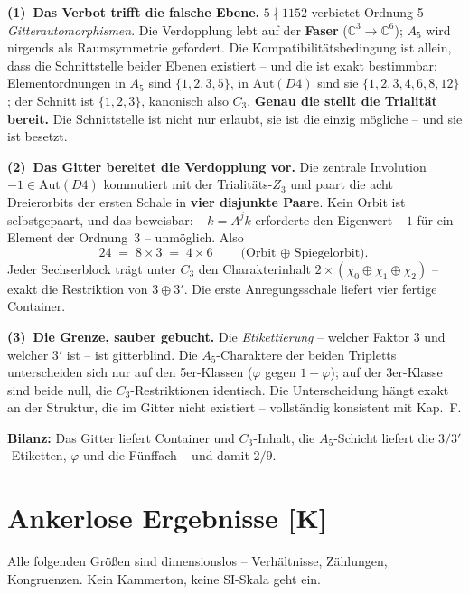 \documentclass[11pt]{report}
\begin{document}
\textbf{(1)~Das Verbot trifft die falsche Ebene.} $5\nmid1152$
verbietet Ordnung-5-\emph{Gitterautomorphismen}. Die Verdopplung
lebt auf der \textbf{Faser} ($\mathbb{C}^3\to\mathbb{C}^6$); $A_5$
wird nirgends als Raumsymmetrie gefordert. Die Kompatibilitäts\-bedingung
ist allein, dass die Schnittstelle beider Ebenen existiert -- und
die ist exakt bestimmbar: Elementordnungen in $A_5$ sind
$\{1,2,3,5\}$, in $\text{Aut}(D4)$ sind sie
$\{1,2,3,4,6,8,12\}$; der Schnitt ist $\{1,2,3\}$, kanonisch
also $C_3$. \textbf{Genau die stellt die Trialität bereit.} Die
Schnittstelle ist nicht nur erlaubt, sie ist die einzig mögliche --
und sie ist besetzt.

\textbf{(2)~Das Gitter bereitet die Verdopplung vor.} Die zentrale
Involution $-1 \in \text{Aut}(D4)$ kommutiert mit der
Trialitäts-$Z_3$ und paart die acht Dreierorbits der ersten Schale
in \textbf{vier disjunkte Paare}. Kein Orbit ist selbstgepaart, und
das beweisbar: $-k = A^j k$ erforderte den Eigenwert $-1$ für ein
Element der Ordnung~3 -- unmöglich. Also
\begin{equation}
  24 \;=\; 8\times3 \;=\; 4\times6
  \qquad\text{(Orbit $\oplus$ Spiegelorbit).}
\end{equation}
Jeder Sechserblock trägt unter $C_3$ den Charakterinhalt
$2\times(\chi_0\oplus\chi_1\oplus\chi_2)$ -- exakt die Restriktion
von $3\oplus3'$. Die erste Anregungsschale liefert vier fertige
Container.

\textbf{(3)~Die Grenze, sauber gebucht.} Die \emph{Etikettierung} --
welcher Faktor $3$ und welcher $3'$ ist -- ist gitterblind. Die
$A_5$-Charaktere der beiden Tripletts unterscheiden sich nur auf den
5er-Klassen ($\varphi$ gegen $1-\varphi$); auf der 3er-Klasse sind
beide null, die $C_3$-Restriktionen identisch. Die Unterscheidung
hängt exakt an der Struktur, die im Gitter nicht existiert --
vollständig konsistent mit Kap.~F.

\textbf{Bilanz:} Das Gitter liefert Container und $C_3$-Inhalt, die
$A_5$-Schicht liefert die $3/3'$-Etiketten, $\varphi$ und die
Fünffach -- und damit $2/9$.

\chapter{Ankerlose Ergebnisse [K]}

Alle folgenden Größen sind dimensionslos -- Verhältnisse, Zählungen,
Kongruenzen. Kein Kammerton, keine SI-Skala geht ein.
\end{document}
